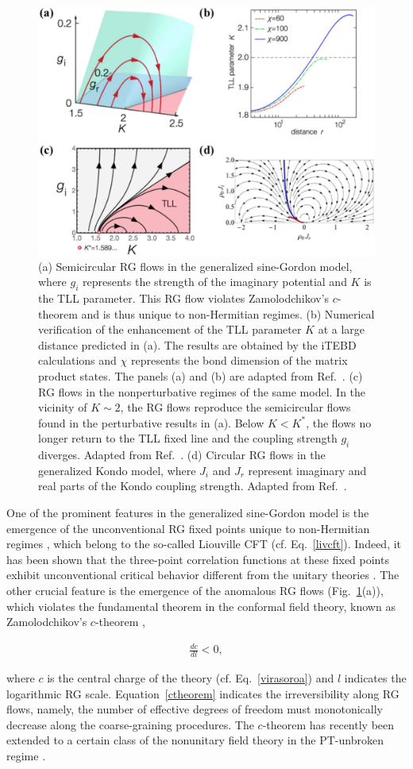 \documentclass{tADP2e}
\theoremstyle{plain}
\newcommand{\eqn}[1]{
\begin{eqnarray}
	#1
\end{eqnarray}
}
\theoremstyle{plain}
\theoremstyle{definition}
\begin{document}
\begin{figure}[t]
\begin{center}
\includegraphics[width=11.5cm]{./Figures/fig_4_crit.pdf}
\end{center}
\caption{(a) Semicircular RG flows in the generalized sine-Gordon model, where $g_i$ represents the strength of the imaginary potential and $K$ is the TLL parameter. This RG flow violates Zamolodchikov's $c$-theorem and is thus unique to non-Hermitian regimes. (b) Numerical verification of the enhancement of the TLL parameter $K$ at a large distance predicted in (a). The results are obtained by the iTEBD calculations and $\chi$ represents the bond dimension of the matrix product states. The panels (a) and (b) are adapted from  Ref.~\cite{YA17nc}. (c) RG flows in the nonperturbative regimes of the same model. In the vicinity of $K\sim2$, the RG flows reproduce the semicircular flows found in the perturbative results in (a). Below $K<K^*$, the flows no longer return to the TLL fixed line and the coupling strength $g_i$ diverges. Adapted from Ref.~\cite{YAbook}. (d) Circular RG flows in the generalized Kondo model, where $J_i$ and $J_r$ represent imaginary and real parts of the Kondo coupling strength. Adapted from Ref.~\cite{NM18}.
}
\label{fig:4crit}
\end{figure}

One of the prominent features in the generalized sine-Gordon model is the emergence of the unconventional RG fixed points unique to non-Hermitian regimes \cite{YA17nc}, which belong to the so-called Liouville CFT \cite{NS90} (cf. Eq.~\eqref{livcft}). Indeed, it has been shown that the three-point correlation functions at these fixed points  exhibit unconventional critical behavior different from the unitary theories \cite{IY16}.
The other crucial feature is the emergence of the anomalous RG flows (Fig.~\ref{fig:4crit}(a)), which violates the fundamental theorem in the conformal field theory, known as Zamolodchikov's $c$-theorem \cite{ZAB86}, 
\eqn{\frac{dc}{dl}<0,\label{ctheorem}}
where $c$ is the central charge of the theory (cf. Eq.~\eqref{virasoroa}) and $l$ indicates the logarithmic RG scale. 
Equation~\eqref{ctheorem} indicates the irreversibility  along RG flows, namely,  the number of effective degrees of freedom must monotonically decrease along the coarse-graining procedures. The $c$-theorem has recently been extended to a certain class of the nonunitary field theory in the PT-unbroken regime \cite{OAC17}.
\end{document}
